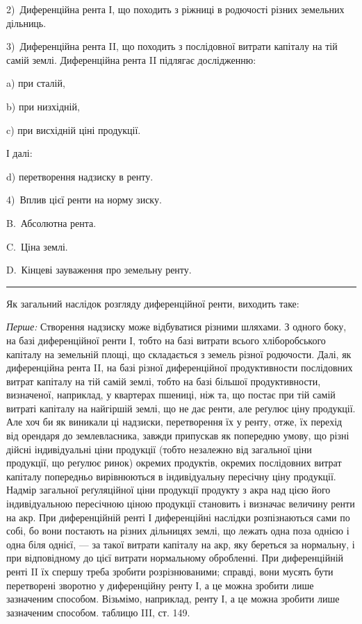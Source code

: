 
2)~Диференційна рента І, що походить з ріжниці в родючості різних земельних
дільниць.

3)~Диференційна рента II, що походить з послідовної витрати капіталу
на тій самій землі. Диференційна рента II підлягає дослідженню:

a) при сталій,

b) при низхідній,

c) при висхідній ціні продукції.

І далі:

d) перетворення надзиску в ренту.

4)~Вплив цієї ренти на норму зиску.

B.~Абсолютна рента.

C.~Ціна землі.

D.~Кінцеві зауваження про земельну ренту.

\pfbreak

Як загальний наслідок розгляду диференційної ренти, виходить таке:

\emph{Перше:} Створення надзиску може відбуватися різними шляхами. З одного
боку, на базі диференційної ренти І, тобто на базі витрати всього
хліборобського капіталу на земельній площі, що складається з земель різної
родючости. Далі, як диференційна рента II, на базі різної диференційної продуктивности
послідовних витрат капіталу на тій самій землі, тобто на базі
більшої продуктивности, визначеної, наприклад, у квартерах пшениці, ніж та,
що постає при тій самій витраті капіталу на найгіршій землі, що не дає ренти,
але реґулює ціну продукції. Але хоч би як виникали ці надзиски, перетворення
їх у ренту, отже, їх перехід від орендаря до землевласника, завжди припускав
як попередню умову, що різні дійсні індивідуальні ціни продукції (тобто незалежно
від загальної ціни продукції, що реґулює ринок) окремих продуктів, окремих
послідовних витрат капіталу попередньо вирівнюються в індивідуальну
пересічну ціну продукції. Надмір загальної реґуляційної ціни продукції продукту
з акра над цією його індивідуальною пересічною ціною продукції становить
і визначає величину ренти на акр. При диференційній ренті І диференційні
наслідки розпізнаються сами по собі, бо вони постають на різних дільницях
землі, що лежать одна поза однією і одна біля однієї, — за такої витрати капіталу
на акр, яку береться за нормальну, і при відповідному до цієї витрати
нормальному обробленні. При диференційній ренті II їх спершу треба зробити
розрізнюваними; справді, вони мусять бути перетворені зворотно у диференційну
ренту І, а це можна зробити лише зазначеним способом. Візьмімо, наприклад,
ренту І, а це можна зробити лише зазначеним способом.
таблицю III, ст. 149.

